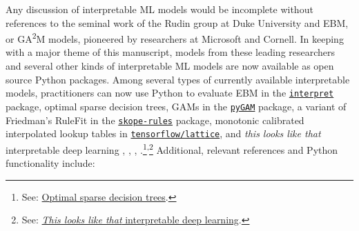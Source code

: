 \documentclass[information,article,submit,moreauthors,pdftex]{definitions/mdpi}
\begin{document}
Any discussion of interpretable ML models would be incomplete without references to the seminal work of the Rudin group at Duke University and EBM, or GA\textsuperscript{2}M models, pioneered by researchers at Microsoft and Cornell. In keeping with a major theme of this manuscript, models from these leading researchers and several other kinds of interpretable ML models are now available as open source Python packages. Among several types of currently available interpretable models, practitioners can now use Python to evaluate EBM in the \href{https://github.com/interpretml/interpret}{\texttt{interpret}} package, optimal sparse decision trees, GAMs in the \href{https://github.com/dswah/pyGAM}{\texttt{pyGAM}} package, a variant of Friedman's RuleFit  in the \href{https://github.com/scikit-learn-contrib/skope-rules}{\texttt{skope-rules}} package, monotonic calibrated interpolated lookup tables in \href{https://github.com/tensorflow/lattice}{\texttt{tensorflow/lattice}}, and \textit{this looks like that} interpretable deep learning \cite{osdt}, \cite{rulefit}, \cite{lattice}, \cite{this_looks_like_that}.\footnote{See: \href{https://github.com/xiyanghu/OSDT}{Optimal sparse decision trees}.}\textsuperscript{,}\footnote{See: \href{https://github.com/cfchen-duke/ProtoPNet}{\textit{This looks like that} interpretable deep learning}.} Additional, relevant references and Python functionality include:
\end{document}
